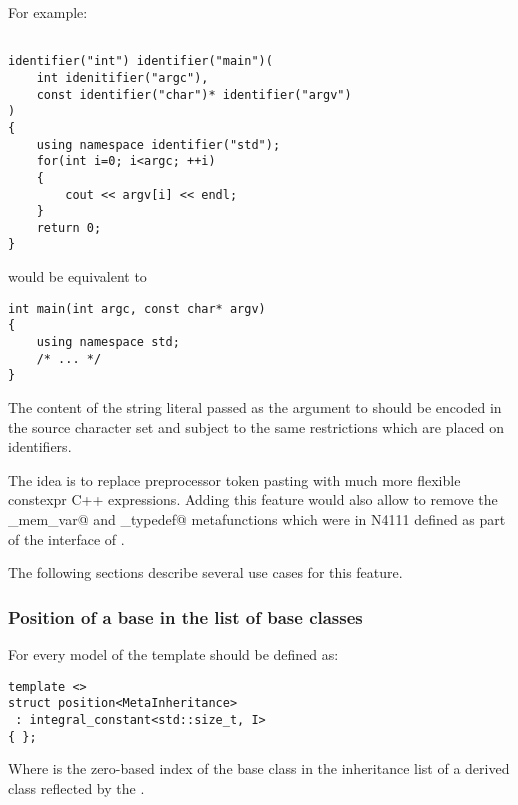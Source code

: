 For example:

\begin{verbatim}

identifier("int") identifier("main")(
	int idenitifier("argc"),
	const identifier("char")* identifier("argv")
)
{
	using namespace identifier("std");
	for(int i=0; i<argc; ++i)
	{
		cout << argv[i] << endl;
	}
	return 0;
}

\end{verbatim}

would be equivalent to

\begin{verbatim}
int main(int argc, const char* argv)
{
	using namespace std;
	/* ... */
}
\end{verbatim}

The content of the string literal passed as the argument to \verb@identifier@
should be encoded in the source character set and subject to the same restrictions
which are placed on identifiers.

The idea is to replace preprocessor token pasting with much more flexible constexpr C++ expressions.
Adding this feature would also allow to remove the \verb@named_mem_var@ and
\verb@named_typedef@ metafunctions which were in N4111 defined as part of
the interface of .

The following sections describe several use cases for this feature.

\subsubsection{Position of a base in the list of base classes}

For every model of  the \verb@position@ template should be defined as:

\begin{verbatim}
template <>
struct position<MetaInheritance>
 : integral_constant<std::size_t, I>
{ };
\end{verbatim}

Where \verb@I@ is the zero-based index of the base class in the inheritance list of a derived class
reflected by the .
